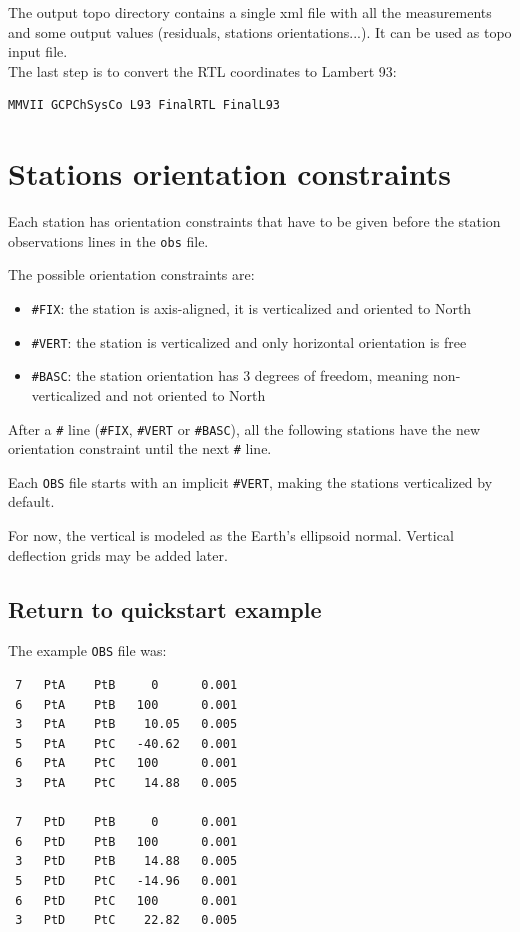 The output topo directory contains a single xml file with all the measurements and some output values (residuals,
stations orientations...). It can be used as topo input file.
\\

The last step is to convert the RTL coordinates to Lambert 93:

\begin{lstlisting}
MMVII GCPChSysCo L93 FinalRTL FinalL93
\end{lstlisting}


\section{Stations orientation constraints}

Each station has orientation constraints that have to be given before the station observations lines in the \texttt{{obs}} file.

The possible orientation constraints are:
\begin{itemize}
   \item \texttt{\#FIX}: the station is axis-aligned, it is verticalized and oriented to North
   \item \texttt{\#VERT}: the station is verticalized and only horizontal orientation is free
   \item \texttt{\#BASC}: the station orientation has 3 degrees of freedom, meaning non-verticalized and not oriented to North
\end{itemize}

After a \texttt{\#} line (\texttt{\#FIX}, \texttt{\#VERT} or \texttt{\#BASC}), all the following stations have the new orientation constraint until the next \texttt{\#} line.

Each \texttt{OBS} file starts with an implicit \texttt{\#VERT}, making the stations verticalized by default.

For now, the vertical is modeled as the Earth's ellipsoid normal. Vertical deflection grids may be added later.


\subsection{Return to quickstart example}
The example \texttt{OBS} file was:
\begin{verbatim}
 7   PtA    PtB     0      0.001
 6   PtA    PtB   100      0.001
 3   PtA    PtB    10.05   0.005
 5   PtA    PtC   -40.62   0.001
 6   PtA    PtC   100      0.001
 3   PtA    PtC    14.88   0.005

 7   PtD    PtB     0      0.001
 6   PtD    PtB   100      0.001
 3   PtD    PtB    14.88   0.005
 5   PtD    PtC   -14.96   0.001
 6   PtD    PtC   100      0.001
 3   PtD    PtC    22.82   0.005
\end{verbatim}

